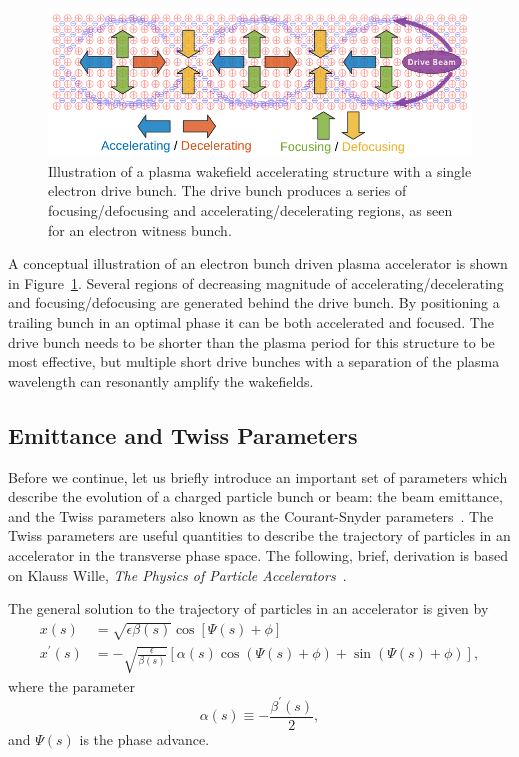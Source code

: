 \begin{figure}[hbt]
    \centering
    \includegraphics[width=0.85\linewidth]{figures/PlasmaWakefield}
    \caption{\label{Fig:PWFA:Illust} Illustration of a plasma wakefield accelerating structure with a single electron drive bunch.
    The drive bunch produces a series of focusing\slash de\-fo\-cus\-ing and accelerating\slash de\-cel\-e\-rat\-ing regions, as seen for an electron witness bunch.}
\end{figure}

A conceptual illustration of an electron bunch driven plasma accelerator is shown in Figure~\ref{Fig:PWFA:Illust}.
Several regions of decreasing magnitude of accelerating\slash decelerating and focusing\slash defocusing are generated behind the drive bunch.
By positioning a trailing bunch in an optimal phase it can be both accelerated and focused.
The drive bunch needs to be shorter than the plasma period for this structure to be most effective, but multiple short drive bunches with a separation of the plasma wavelength can resonantly amplify the wakefields.

\subsection{Emittance and Twiss Parameters}
\label{Int:BPI:EnTwiss}

Before we continue, let us briefly introduce an important set of parameters which describe the evolution of a charged particle bunch or beam: the beam emittance, and the Twiss parameters also known as the Courant-Snyder parameters~\cite{courant:1958}.
The Twiss parameters are useful quantities to describe the trajectory of particles in an accelerator in the transverse phase space.
The following, brief, derivation is based on Klauss Wille, \textit{The Physics of Particle Accelerators}~\cite{wille:2001}.

The general solution to the trajectory of particles in an accelerator is given by
\begin{align}
    x(s)          &=  \sqrt{\epsilon\beta(s)} \cos\left[\Psi(s) + \phi\right] \label{EQ:PTrajX} \\
    x^{\prime}(s) &= -\sqrt{\frac{\epsilon}{\beta(s)}}
                     \left[\alpha(s)\cos\left(\Psi(s) + \phi\right) + \sin\left(\Psi(s) + \phi\right)\right], \label{EQ:PTrajXP}
\end{align}
where the parameter
\begin{equation}
    \alpha(s) \equiv -\frac{\beta^{\prime}(s)}{2}, \label{EQ:TwissAlpha}
\end{equation}
and $\Psi(s)$ is the phase advance.

